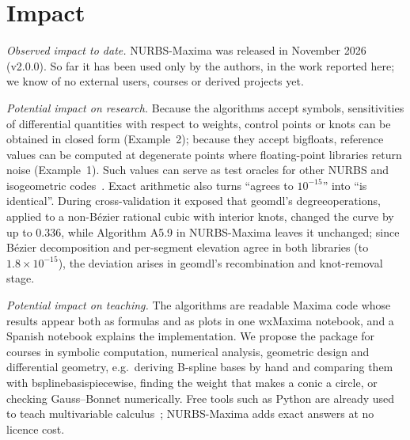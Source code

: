 \documentclass[preprint,12pt]{elsarticle}
\newcommand{\pkg}{NURBS-Maxima}
\newcommand{\code}[1]{{\ttfamily\def\_{\textunderscore\allowbreak}#1}}
\begin{document}
\begin{table}[t]
\centering
\small
\resizebox{\linewidth}{!}{}
\caption{Mean time per call in ms (Maxima 5.46.0 with GCL; geomdl 5.5.1 on CPython 3.13; Intel Xeon @ 2.30\,GHz). geomdl has no surface-curvature routine.}
\label{tab:bench}
\end{table}

\section{Impact}
\label{sec:impact}

\emph{Observed impact to date.} \pkg{} was released in November 2026 (v2.0.0). So far it has been used only by the authors, in the work reported here; we know of no external users, courses or derived projects yet.

\emph{Potential impact on research.} Because the algorithms accept symbols, sensitivities of differential quantities with respect to weights, control points or knots can be obtained in closed form (Example~2); because they accept bigfloats, reference values can be computed at degenerate points where floating-point libraries return noise (Example~1). Such values can serve as test oracles for other NURBS and isogeometric codes~\cite{Hughes2005,deFalco2011}. Exact arithmetic also turns ``agrees to $10^{-15}$'' into ``is identical''. During cross-validation it exposed that geomdl's \code{degree\_operations}, applied to a non-Bézier rational cubic with interior knots, changed the curve by up to $0.336$, while Algorithm A5.9 in \pkg{} leaves it unchanged; since Bézier decomposition and per-segment elevation agree in both libraries (to $1.8\times10^{-15}$), the deviation arises in geomdl's recombination and knot-removal stage.

\emph{Potential impact on teaching.} The algorithms are readable Maxima code whose results appear both as formulas and as plots in one wxMaxima notebook, and a Spanish notebook explains the implementation. We propose the package for courses in symbolic computation, numerical analysis, geometric design and differential geometry, e.g.\ deriving B-spline bases by hand and comparing them with \code{bspline\_basis\_piecewise}, finding the weight that makes a conic a circle, or checking Gauss--Bonnet numerically. Free tools such as Python are already used to teach multivariable calculus~\cite{Surbakti2024,Saragih2024}; \pkg{} adds exact answers at no licence cost.
\end{document}
